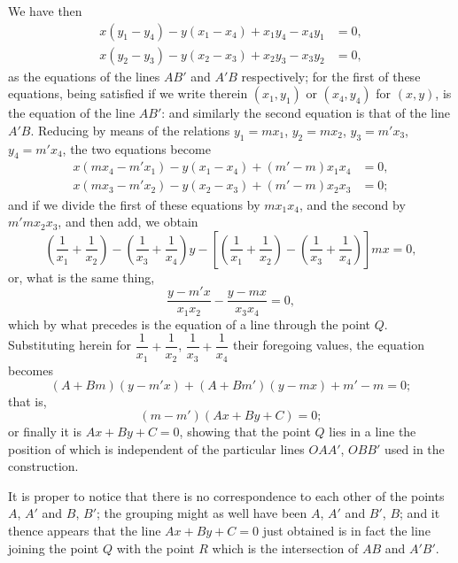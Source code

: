 \documentclass[11pt,a4paper]{book}
\begin{document}
We have then
\begin{align*}
x(y_1-y_4) - y(x_1-x_4) + x_1y_4 - x_4y_1 &= 0,\\
x(y_2-y_3) - y(x_2-x_3) + x_2y_3 - x_3y_2 &= 0,
\end{align*}
as the equations of the lines $AB'$ and $A'B$ respectively; for the first of these equations, being satisfied if we write therein $(x_1,y_1)$ or $(x_4,y_4)$ for $(x,y)$, is the equation of the line $AB'$: and similarly the second equation is that of the line $A'B$. Reducing by means of the relations $y_1=mx_1$, $y_2=mx_2$, $y_3=m'x_3$, $y_4=m'x_4$, the two equations become
\begin{align*}
x(mx_4-m'x_1) - y(x_1-x_4) + (m'-m)x_1x_4 &= 0,\\
x(mx_3-m'x_2) - y(x_2-x_3) + (m'-m)x_2x_3 &= 0;
\end{align*}
and if we divide the first of these equations by $mx_1x_4$, and the second by $m'mx_2x_3$, and then add, we obtain
\[
\left(\frac{1}{x_1}+\frac{1}{x_2}\right) - \left(\frac{1}{x_3}+\frac{1}{x_4}\right) y - \left[\left(\frac{1}{x_1}+\frac{1}{x_2}\right) - \left(\frac{1}{x_3}+\frac{1}{x_4}\right)\right] mx = 0,
\]
or, what is the same thing,
\[
\frac{y-m'x}{x_1x_2} - \frac{y-mx}{x_3x_4} = 0,
\]
which by what precedes is the equation of a line through the point $Q$. Substituting herein for $\dfrac{1}{x_1}+\dfrac{1}{x_2}$, $\dfrac{1}{x_3}+\dfrac{1}{x_4}$ their foregoing values, the equation becomes
\[
(A+Bm)(y-m'x) + (A+Bm')(y-mx) + m'-m = 0;
\]
that is,
\[
(m-m')(Ax+By+C) = 0;
\]
or finally it is $Ax+By+C=0$, showing that the point $Q$ lies in a line the position of which is independent of the particular lines $OAA'$, $OBB'$ used in the construction.

It is proper to notice that there is no correspondence to each other of the points $A$, $A'$ and $B$, $B'$; the grouping might as well have been $A$, $A'$ and $B'$, $B$; and it thence appears that the line $Ax+By+C=0$ just obtained is in fact the line joining the point $Q$ with the point $R$ which is the intersection of $AB$ and $A'B'$.
\end{document}
